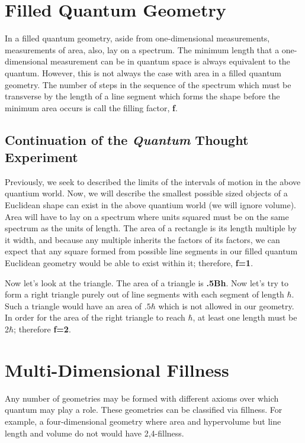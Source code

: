 \documentclass[12pt]{scrreprt}
\begin{document}
\section{Filled Quantum Geometry}
In a filled quantum geometry, aside from one-dimensional measurements, measurements of area, also, lay on a spectrum. The minimum length that a one-dimensional measurement can be in quantum space is always equivalent to the quantum. However, this is not always the case with area in a filled quantum geometry.  The number of steps in the sequence of the spectrum which must be transverse by the length of a line segment which forms the shape before the minimum area occurs is call the filling factor, \textbf{f}.
\subsection{Continuation of the \textit{Quantum} Thought Experiment}
\par Previously, we seek to described the limits of the intervals of motion in the above quantium world. Now, we will describe the smallest possible sized objects of a Euclidean shape can exist in the above quantium world (we will ignore volume). Area will have to lay on a spectrum where units squared must be on the same spectrum as the units of length. The area of a rectangle is its length multiple by it width, and because any multiple inherits the factors of its factors, we can expect that any square formed from possible line segments in our filled quantum Euclidean geometry would be able to exist within it; therefore, \textbf{f=1}. 
\par Now let's look at the triangle. The area of a triangle is \textbf{.5Bh}. Now let's try to form a right triangle purely out of line segments with each segment of length $\hbar$. Such a triangle would have an area of $.5\hbar$ which is not allowed in our geometry. In order for the area of the right triangle to reach $\hbar$, at least one length must be 2$\hbar$; therefore \textbf{f=2}.
\section{Multi-Dimensional Fillness}
Any number of geometries may be formed with different axioms over which quantum may play a role. These geometries can be classified via fillness. For example, a four-dimensional geometry where area and hypervolume but line length and volume do not would have 2,4-fillness.
\end{document}
